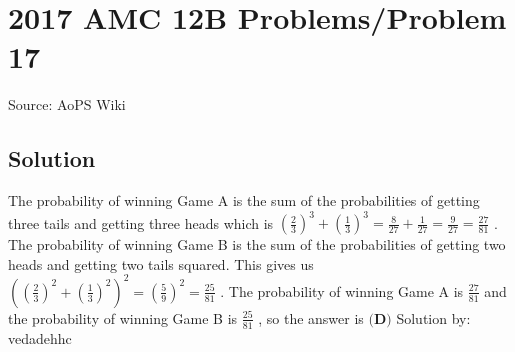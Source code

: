 \documentclass[12pt]{article}
\begin{document}
\section*{{2017 AMC 12B Problems/Problem 17}}
Source: AoPS Wiki

\subsection*{Solution}
The probability of winning Game A is the sum of the probabilities of getting three tails and getting three heads which is $\left(\frac{2}{3}\right)^3 + \left(\frac{1}{3}\right)^3 = \frac{8}{27} + \frac{1}{27} = \frac{9}{27} = \frac{27}{81}$ . The probability of winning Game B is the sum of the probabilities of getting two heads and getting two tails squared. This gives us $\left(\left(\frac{2}{3}\right)^2 + \left(\frac{1}{3}\right)^2 \right)^2 = \left(\frac{5}{9}\right)^2 = \frac{25}{81}$ . The probability of winning Game A is $\frac{27}{81}$ and the probability of winning Game B is $\frac{25}{81}$ , so the answer is $\boxed{\textbf{(D)}}$ Solution by: vedadehhc
\end{document}
